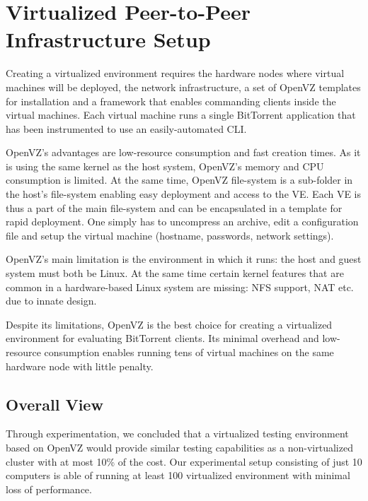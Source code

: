 \section{Virtualized Peer-to-Peer Infrastructure Setup}
\label{sec:virt-infra:setup}

Creating a virtualized environment requires the hardware nodes where virtual
machines will be deployed, the network infrastructure, a set of OpenVZ
templates for installation and a framework that enables commanding clients
inside the virtual machines.  Each virtual machine runs a single BitTorrent
application that has been instrumented to use an easily-automated CLI.

OpenVZ's advantages are low-resource consumption and fast creation times. As
it is using the same kernel as the host system, OpenVZ's memory and CPU
consumption is limited. At the same time, OpenVZ file-system is a sub-folder
in the host's file-system enabling easy deployment and access to the VE. Each
VE is thus a part of the main file-system and can be encapsulated in a
template for rapid deployment. One simply has to uncompress an archive, edit a
configuration file and setup the virtual machine (hostname, passwords, network
settings).

OpenVZ's main limitation is the environment in which it runs: the host and
guest system must both be Linux. At the same time certain kernel features that
are common in a hardware-based Linux system are missing: NFS support, NAT etc.
due to innate design.

Despite its limitations, OpenVZ is the best choice for creating a virtualized
environment for evaluating BitTorrent clients. Its minimal overhead and
low-resource consumption enables running tens of virtual machines on the same
hardware node with little penalty.

\subsection{Overall View}
\label{sec:virt-overall}



Through experimentation, we concluded that a virtualized testing environment
based on OpenVZ would provide similar testing capabilities as a
non-virtualized cluster with at most 10\% of the cost. Our  experimental setup
consisting of just 10 computers is able of running at least 100 virtualized
environment with minimal loss of performance.

